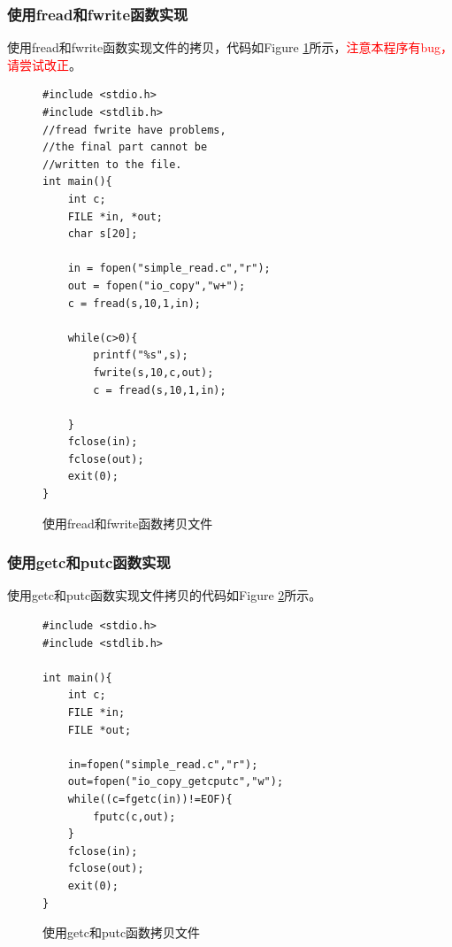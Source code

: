 \subsubsection{使用fread和fwrite函数实现}
使用fread和fwrite函数实现文件的拷贝，代码如Figure \ref{frdfwt}所示，\textcolor{red}{注意本程序有bug，请尝试改正}。
\begin{figure}
\begin{lstlisting}
#include <stdio.h>
#include <stdlib.h>
//fread fwrite have problems,
//the final part cannot be 
//written to the file.
int main(){
	int c;
	FILE *in, *out;
	char s[20];

	in = fopen("simple_read.c","r");
	out = fopen("io_copy","w+");
	c = fread(s,10,1,in);
	
	while(c>0){
		printf("%s",s);
		fwrite(s,10,c,out);
		c = fread(s,10,1,in);
		
	}
	fclose(in);
	fclose(out);
	exit(0);
}

\end{lstlisting}
\caption{使用fread和fwrite函数拷贝文件}
\label{frdfwt}
\end{figure}
\subsubsection{使用getc和putc函数实现}
使用getc和putc函数实现文件拷贝的代码如Figure \ref{getputc}所示。
\begin{figure}
\begin{lstlisting}
#include <stdio.h>
#include <stdlib.h>

int main(){
	int c;
	FILE *in;
	FILE *out;

	in=fopen("simple_read.c","r");
	out=fopen("io_copy_getcputc","w");
	while((c=fgetc(in))!=EOF){
		fputc(c,out);
	}
	fclose(in);
	fclose(out);
	exit(0);
}
\end{lstlisting}
\caption{使用getc和putc函数拷贝文件}
\label{getputc}
\end{figure}